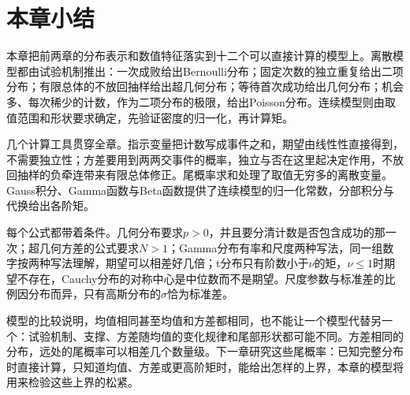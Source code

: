 \section{本章小结}
\label{sec:cdist-summary}

本章把前两章的分布表示和数值特征落实到十二个可以直接计算的模型上。离散模型都由试验机制推出：一次成败给出Bernoulli分布；固定次数的独立重复给出二项分布；有限总体的不放回抽样给出超几何分布；等待首次成功给出几何分布；机会多、每次稀少的计数，作为二项分布的极限，给出Poisson分布。连续模型则由取值范围和形状要求确定，先验证密度的归一化，再计算矩。

几个计算工具贯穿全章。指示变量把计数写成事件之和，期望由线性性直接得到，不需要独立性；方差要用到两两交事件的概率，独立与否在这里起决定作用，不放回抽样的负牵连带来有限总体修正。尾概率求和处理了取值无穷多的离散变量。Gauss积分、Gamma函数与Beta函数提供了连续模型的归一化常数，分部积分与代换给出各阶矩。

每个公式都带着条件。几何分布要求$p>0$，并且要分清计数是否包含成功的那一次；超几何方差的公式要求$N>1$；Gamma分布有率和尺度两种写法，同一组数字按两种写法理解，期望可以相差好几倍；t分布只有阶数小于$\nu$的矩，$\nu\leq1$时期望不存在，Cauchy分布的对称中心是中位数而不是期望。尺度参数与标准差的比例因分布而异，只有高斯分布的$\sigma$恰为标准差。

模型的比较说明，均值相同甚至均值和方差都相同，也不能让一个模型代替另一个：试验机制、支撑、方差随均值的变化规律和尾部形状都可能不同。方差相同的分布，远处的尾概率可以相差几个数量级。下一章研究这些尾概率：已知完整分布时直接计算，只知道均值、方差或更高阶矩时，能给出怎样的上界，本章的模型将用来检验这些上界的松紧。

